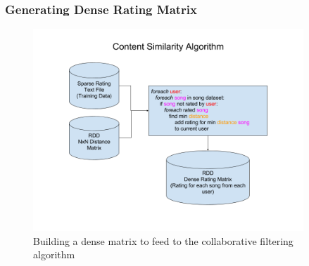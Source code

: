 \documentclass[11pt]{beamer}
\begin{document}
\begin{frame}
\frametitle{Generating Dense Rating Matrix}
  \begin{figure}[h]
    \centering
    \includegraphics[width=4in]{figures/content_similarity_algorithm.png}
    \caption{Building a dense matrix to feed to the collaborative filtering algorithm}
    \label{fig:content_similarity_algorithm} 
  \end{figure}
\end{frame}
\end{document}
